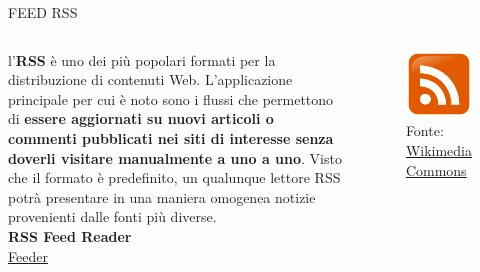 \documentclass[aspectratio=1610]{beamer}
\begin{document}
\begin{frame}{FEED RSS}
    \begin{columns}
            \justifying
            l'\textbf{RSS} è uno dei più popolari formati per la distribuzione di contenuti Web. 
            L'applicazione principale per cui è noto sono i flussi che permettono di \textbf{essere aggiornati su 
            nuovi articoli o commenti pubblicati nei siti di interesse senza doverli visitare manualmente 
            a uno a uno}. Visto che il formato è predefinito, un qualunque lettore RSS potrà presentare 
            in una maniera omogenea notizie provenienti dalle fonti più diverse.\\
            \bigskip
            \tiny{\textbf{RSS Feed Reader}}\\
            \tiny{\href{https://f-droid.org/it/packages/com.nononsenseapps.feeder/}{Feeder}}
            \begin{figure}
                \includegraphics[width=\linewidth]{img/rss.png}
                \caption{{Fonte: \href{https://commons.wikimedia.org/wiki/File:Rss-feed.svg}{Wikimedia Commons}}}
            \end{figure}
    \end{columns}
\end{frame}
\end{document}
